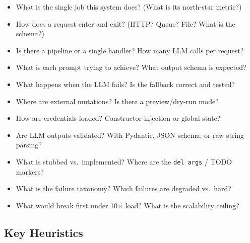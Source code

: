 \documentclass[12pt, a4paper]{article}
\begin{document}
\begin{itemize}[leftmargin=1.4cm, label=$\square$]
  \item What is the single job this system does? (What is its north-star metric?)
  \item How does a request enter and exit? (HTTP? Queue? File? What is the schema?)
  \item Is there a pipeline or a single handler? How many LLM calls per request?
  \item What is each prompt trying to achieve? What output schema is expected?
  \item What happens when the LLM fails? Is the fallback correct and tested?
  \item Where are external mutations? Is there a preview/dry-run mode?
  \item How are credentials loaded? Constructor injection or global state?
  \item Are LLM outputs validated? With Pydantic, JSON schema, or raw string parsing?
  \item What is stubbed vs.\ implemented? Where are the \texttt{del args} / TODO markers?
  \item What is the failure taxonomy? Which failures are degraded vs.\ hard?
  \item What would break first under 10$\times$ load? What is the scalability ceiling?
\end{itemize}

\subsection{Key Heuristics}
\end{document}
